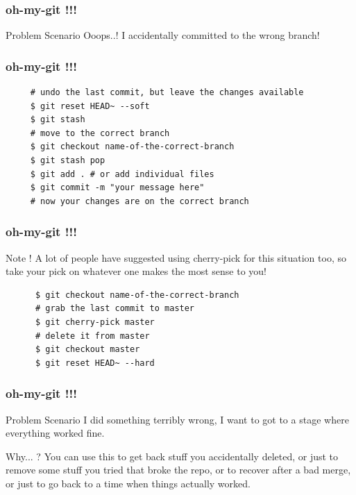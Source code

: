\documentclass[10pt]{beamer}
\begin{document}
\begin{frame}
  \frametitle{oh-my-git !!!}
  \begin{alertblock}{Problem Scenario}
   Ooops..! I accidentally committed to the wrong branch!
  \end{alertblock}
\end{frame}

\begin{frame}[fragile]
  \frametitle{oh-my-git !!!}
  \begin{example}[Solution]
    \begin{verbatim}
     # undo the last commit, but leave the changes available
     $ git reset HEAD~ --soft
     $ git stash
     # move to the correct branch
     $ git checkout name-of-the-correct-branch
     $ git stash pop
     $ git add . # or add individual files
     $ git commit -m "your message here"
     # now your changes are on the correct branch
    \end{verbatim}
  \end{example}
\end{frame}

\begin{frame}[fragile]
  \frametitle{oh-my-git !!!}
  \begin{block}{Note !}
    A lot of people have suggested using cherry-pick for this situation too,
    so take your pick on whatever one makes the most sense to you!
  \end{block}
  \pause
  \begin{example}[Solution]
    \begin{verbatim}
      $ git checkout name-of-the-correct-branch
      # grab the last commit to master
      $ git cherry-pick master
      # delete it from master
      $ git checkout master
      $ git reset HEAD~ --hard
    \end{verbatim}
  \end{example}
\end{frame}

\begin{frame}
  \frametitle{oh-my-git !!!}
  \begin{alertblock}{Problem Scenario}
    I did something terribly wrong, I want to got to a stage where everything worked fine.
  \end{alertblock}
  \pause
  \begin{block}{Why... ?}
    You can use this to get back stuff you accidentally deleted, or just to remove some stuff you
    tried that broke the repo, or to recover after a bad merge, or just to go back to a time when things actually worked.
  \end{block}
\end{frame}
\end{document}
